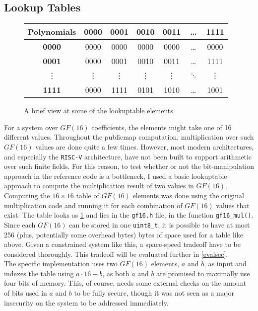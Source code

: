 \subsection{Lookup Tables} \label{opt:lookup}
\begin{figure}[t]
    \centering
    \begin{tabular}{|c|c|c|c|c|c|c|}
        \hline
            \textbf{Polynomials} & \textbf{0000} & \textbf{0001} & \textbf{0010} & \textbf{0011} & \dots & \textbf{1111} \\
        \hline
            \textbf{0000} & 0000 & 0000 & 0000 & 0000 & \dots & 0000\\
        \hline
            \textbf{0001} & 0000 & 0001 & 0010 & 0011 & \dots & 1111\\
        \hline
            \vdots & \vdots & \vdots & \vdots & \vdots & $\ddots$ & \vdots\\
        \hline
            \textbf{1111} & 0000 & 1111 & 0101 & 1010 & \dots & 1001\\
        \hline
    \end{tabular}
    \caption{A brief view at some of the lookuptable elements}
    \label{lookuptable}
\end{figure}
For a system over $GF(16)$ coefficients, the elements might take one of 16 different values. Throughout the publicmap computation, multiplication over such $GF(16)$ values are done quite a few times. However, most modern architectures, and especially the \texttt{RISC-V} architecture, have not been built to support arithmetic over such finite fields. For this reason, to test whether or not the bit-manipulation approach in the reference code is a bottleneck, I used a basic lookuptable approach to compute the multiplication result of two values in $GF(16)$.\medskip\\
Computing the $16 \times 16$ table of $GF(16)$ elements was done using the original multiplication code and running it for each combination of $GF(16)$ values that exist. The table looks as \cref{lookuptable} and lies in the \texttt{gf16.h} file, in the function \texttt{gf16\_mul()}.\medskip\\
Since each $GF(16)$ can be stored in one \texttt{uint8\_t}, it is possible to have at most 256 (plus, potentially some overhead bytes) bytes of space used for a table like above. Given a constrained system like this, a space-speed tradeoff have to be considered thoroughly. This tradeoff will be evaluated further in \cref{evalsec}.\medskip\\
The specific implementation uses two $GF(16)$ elements, $a$ and $b$, as input and indexes the table using $a \cdot 16 + b$, as both $a$ and $b$ are promised to maximally use four bits of memory. This, of course, needs some external checks on the amount of bits used in $a$ and $b$ to be fully secure, though it was not seen as a major insecurity on the system to be addressed immediately.
